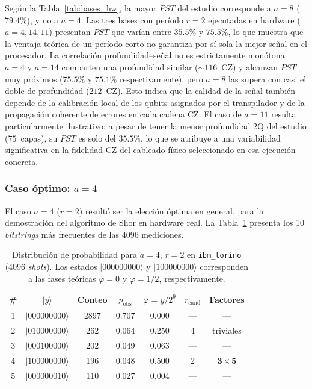 \documentclass[12pt, spanish]{book}
\begin{document}
Según la Tabla~\ref{tab:bases_hw}, la mayor $PST$ del estudio corresponde a $a = 8$ ($79.4\%$), y no a $a = 4$. Las tres bases con período $r = 2$ ejecutadas en hardware ($a = 4, 14, 11$) presentan $PST$ que varían entre $35.5\%$ y $75.5\%$, lo que muestra que la ventaja teórica de un período corto no garantiza por sí sola la mejor señal en el procesador. La correlación profundidad–señal no es estrictamente monótona: $a = 4$ y $a = 14$ comparten una profundidad similar ($\sim 116$~CZ) y alcanzan $PST$ muy próximos ($75.5\%$ y $75.1\%$ respectivamente), pero $a = 8$ las supera con casi el doble de profundidad ($212$~CZ). Esto indica que la calidad de la señal también depende de la calibración local de los qubits asignados por el transpilador y de la propagación coherente de errores en cada cadena CZ. El caso de $a = 11$ resulta particularmente ilustrativo: a pesar de tener la menor profundidad 2Q del estudio ($75$~capas), su $PST$ es solo del $35.5\%$, lo que se atribuye a una variabilidad significativa en la fidelidad CZ del cableado físico seleccionado en esa ejecución concreta.

\subsubsection{Caso óptimo: $a = 4$}

El caso $a = 4$ ($r = 2$) resultó ser la elección óptima en general, para la demostración del algoritmo de Shor en hardware real. La Tabla~\ref{tab:distribucion_a4} presenta los 10 \textit{bitstrings} más frecuentes de las 4096 mediciones.

\begin{table}[H]
    \centering
    \caption{Distribución de probabilidad para $a = 4$, $r = 2$ en \texttt{ibm\_torino} (4096 \textit{shots}). Los estados $|000000000\rangle$ y $|100000000\rangle$ corresponden a las fases teóricas $\varphi = 0$ y $\varphi = 1/2$, respectivamente.\\}
    \label{tab:distribucion_a4}
    \begin{tabular}{ccccccc}
        \hline
        \# & $|y\rangle$         & Conteo & $p_{\text{obs}}$ & $\varphi = y/2^9$ & $r_{\text{cand}}$ & Factores              \\
        \hline
        1  & $|000000000\rangle$ & 2897   & 0.707            & 0.000             & ---               & ---                   \\
        2  & $|010000000\rangle$ & 262    & 0.064            & 0.250             & 4                 & triviales             \\
        3  & $|000100000\rangle$ & 202    & 0.049            & 0.063             & ---               & ---                   \\
        4  & $|100000000\rangle$ & 196    & 0.048            & 0.500             & 2                 & $\mathbf{3 \times 5}$ \\
        5  & $|000000010\rangle$ & 110    & 0.027            & 0.004             & ---               & ---                   \\
        \hline
    \end{tabular}
\end{table}
\end{document}
